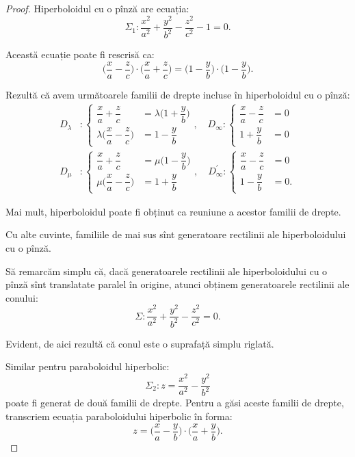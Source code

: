 \documentclass[11pt,a4paper]{article}
\theoremstyle{dotless}
\theoremstyle{dotlessdr}
\begin{document}
\begin{proof}
	Hiperboloidul cu o pînză are ecuația: 
 \[
	\Sigma_1 : \dfrac{x^2}{a^2} + \dfrac{y^2}{b^2} - \dfrac{z^2}{c^2} - 1 = 0.
\]

Această ecuație poate fi rescrisă ca: 
 \[
\Big(\dfrac{x}{a} - \dfrac{z}{c}\Big) \cdot \Big(\dfrac{x}{a} + 
\dfrac{z}{c}\Big) =\Big( 1 - \dfrac{y}{b} \Big) \cdot 
\Big( 1 - \dfrac{y}{b} \Big).
\]

Rezultă că avem următoarele familii de drepte incluse în hiperboloidul cu 
o pînză:
\begin{align*}
D_\lambda &: \begin{cases}
        \dfrac{x}{a} + \dfrac{z}{c} &= \lambda \Big( 1 + \dfrac{y}{b} \Big) \\
        \lambda \Big( \dfrac{x}{a} - \dfrac{z}{c} \Big) &= 1- \dfrac{y}{b}
    \end{cases}, \quad
D_\infty: \begin{cases}
			\dfrac{x}{a} - \dfrac{z}{c} &= 0 \\
			1 + \dfrac{y}{b} &= 0
		  \end{cases} \\
D_\mu &: \begin{cases}	
			\dfrac{x}{a} + \dfrac{z}{c} &= \mu \Big( 1 - \dfrac{y}{b} \Big) \\
			\mu \Big( \dfrac{x}{a} - \dfrac{z}{c} \Big) &= 1 + \dfrac{y}{b}
		\end{cases}, \quad
D^{\prime}_\infty : \begin{cases}
						\dfrac{x}{a} - \dfrac{z}{c} &= 0 \\
						1 - \dfrac{y}{b} &= 0.
\end{cases} 
\end{align*}

Mai mult, hiperboloidul poate fi obținut ca reuniune a acestor familii 
de drepte.

Cu alte cuvinte, familiile de mai sus sînt generatoare rectilinii ale
hiperboloidului cu o pînză.

Să remarcăm simplu că, dacă generatoarele rectilinii ale hiperboloidului cu
o pînză sînt translatate paralel în origine, atunci obținem generatoarele
rectilinii ale conului: 
 \[
	\Sigma: \dfrac{x^2}{a^2} + \dfrac{y^2}{b^2} - \dfrac{z^2}{c^2} = 0.
\]

Evident, de aici rezultă că conul este o suprafață simplu riglată.

Similar pentru paraboloidul hiperbolic: 
 \[
	\Sigma_2 : z = \dfrac{x^2}{a^2} - \dfrac{y^2}{b^2}
\]
poate fi generat de două familii de drepte. Pentru a găsi aceste familii
de drepte, transcriem ecuația paraboloidului hiperbolic în forma: 
 \[
	z = \Big( \dfrac{x}{a} - \dfrac{y}{b} \Big) \cdot 
		\Big( \dfrac{x}{a} + \dfrac{y}{b} \Big).
\]


\end{proof}
\end{document}
